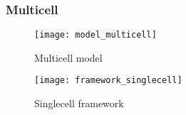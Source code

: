 \begin{frame}
  \frametitle{Multicell}
  \begin{figure}
    \texttt{[image: model\_multicell]}
    \caption{Multicell model}
  \end{figure}
\end{frame}

\begin{frame}
  \begin{figure}
    \texttt{[image: framework\_singlecell]}
    \caption{Singlecell framework}
  \end{figure}
\end{frame}

